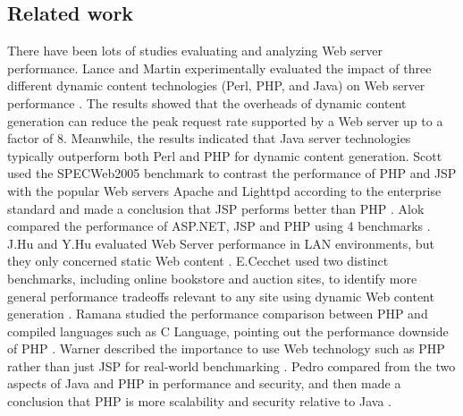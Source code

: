 \documentclass[../thesis.tex]{subfiles}
\begin{document}
\subsection{Related work}
There have been lots of studies evaluating and analyzing Web server performance. Lance and Martin experimentally evaluated the impact of three different dynamic content technologies (Perl, PHP, and Java) on Web server performance \cite{4}. The results showed that the overheads of dynamic content generation can reduce the peak request rate supported by a Web server up to a factor of 8. Meanwhile, the results indicated that Java server technologies typically outperform both Perl and PHP for dynamic content generation. Scott used the SPECWeb2005 benchmark to contrast the performance of PHP and JSP with the popular Web servers Apache and Lighttpd according to the enterprise standard and made a conclusion that JSP performs better than PHP . Alok compared the performance of ASP.NET, JSP and PHP using 4 benchmarks \cite{6}. J.Hu and Y.Hu evaluated Web Server performance in LAN environments, but they only concerned static Web content \cite{7,8}. E.Cecchet used two distinct benchmarks, including online bookstore and auction sites, to identify more general performance tradeoffs relevant to any site using dynamic Web content generation \cite{9}. Ramana studied the performance comparison between PHP and compiled languages such as C Language, pointing out the performance downside of PHP \cite{10}. Warner described the importance to use Web technology such as PHP rather than just JSP for real-world benchmarking \cite{11}. Pedro compared from the two aspects of Java and PHP in performance and security, and then made a conclusion that PHP is more scalability and security relative to Java \cite{12}.
\end{document}

